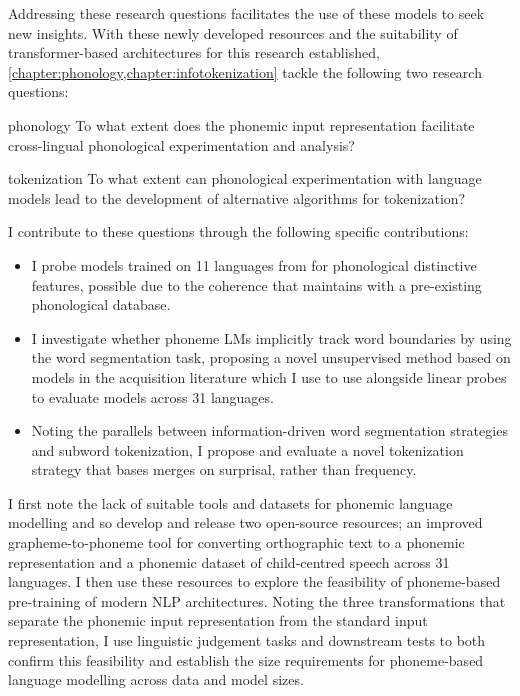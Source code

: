 Addressing these research questions facilitates the use of these models to seek new insights. With these newly developed resources and the suitability of transformer-based architectures for this research established, \cref{chapter:phonology,chapter:infotokenization} tackle the following two research questions:

\begin{question}{}{phonology}
    To what extent does the phonemic input representation facilitate cross-lingual phonological experimentation and analysis?
\end{question}

\begin{question}{}{tokenization}
    To what extent can phonological experimentation with language models lead to the development of alternative algorithms for tokenization? 
\end{question}

I contribute to these questions through the following specific contributions:

\begin{itemize}
    \item I probe models trained on 11 languages from \ipachildes for phonological distinctive features, possible due to the coherence that \gpp maintains with a pre-existing phonological database. 
    \item I investigate whether phoneme LMs implicitly track word boundaries by using the word segmentation task, proposing a novel unsupervised method based on models in the acquisition literature which I use to use alongside linear probes to evaluate models across 31 languages.
    \item Noting the parallels between information-driven word segmentation strategies and subword tokenization, I propose and evaluate a novel tokenization strategy that bases merges on surprisal, rather than frequency.
\end{itemize}

I first note the lack of suitable tools and datasets for phonemic language modelling and so develop and release two open-source resources; an improved grapheme-to-phoneme tool for converting orthographic text to a phonemic representation and a phonemic dataset of child-centred speech across 31 languages. I then use these resources to explore the feasibility of phoneme-based pre-training of modern NLP architectures. Noting the three transformations that separate the phonemic input representation from the standard input representation, I use linguistic judgement tasks and downstream tests to both confirm this feasibility and establish the size requirements for phoneme-based language modelling across data and model sizes. 

